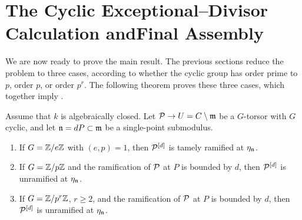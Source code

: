 \section[The Cyclic Exceptional--Divisor Calculation and Final Assembly]
{The Cyclic Exceptional--Divisor Calculation and\newline Final Assembly}

We are now ready to prove the main result. The previous sections reduce the
problem to three cases, according to whether the cyclic group has order prime
to $p$, order $p$, or order $p^r$. The following theorem proves these three
cases, which together imply .

\begin{theorem}
\label{theorem:cyclic_cases_after_blowup}
\label{theorem:ramification_after_blowup_P1}
\label{cor:ramification_after_blowup_is_tame}
\label{theorem:ramification_after_blowup_is_tame_for_p_power}
Assume that $k$ is algebraically closed.
Let $\mathcal{P}\to U=C\setminus\mathfrak{m}$ be a $G$-torsor with $G$ cyclic, and let
$\mathfrak{n}=dP\subset\mathfrak{m}$ be a single-point submodulus.
\begin{enumerate}
    \item If $G=\mathbb{Z}/e\mathbb{Z}$ with $(e,p)=1$, then $\mathcal{P}^{[d]}$ is tamely
    ramified at $\eta_{\mathfrak{n}}$.
    \item If $G=\mathbb{Z}/p\mathbb{Z}$ and the ramification of $\mathcal{P}$ at $P$ is bounded
    by $d$, then $\mathcal{P}^{[d]}$ is unramified at $\eta_{\mathfrak{n}}$.
    \item If $G=\mathbb{Z}/p^r\mathbb{Z}$, $r\geq2$, and the ramification of $\mathcal{P}$ at
    $P$ is bounded by $d$, then $\mathcal{P}^{[d]}$ is unramified at
    $\eta_{\mathfrak{n}}$.
\end{enumerate}
\end{theorem}

